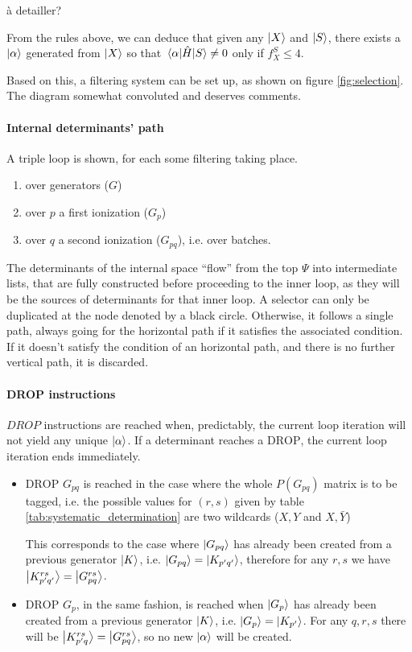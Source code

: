 \documentclass[./thesis.tex]{subfiles}
\begin{document}
\alert{à detailler?}

From the rules above, we can deduce that given any $\ket X$ and $\ket S$, there exists a ${\ket{\alpha}}$ generated from $\ket X$ so that $\mel{\alpha}{\hat{H}}{S} \neq 0$ only if $f_X^S \leq 4$.

Based on this, a filtering system can be set up, as shown on figure \ref{fig:selection}. The diagram somewhat convoluted and deserves comments.

\paragraph{Internal determinants' path}
 
A triple loop is shown, for each some filtering taking place.

\begin{enumerate}
\item
over generators ($G$)
\item
over $p$ a first ionization ($G_p$)
\item
over $q$ a second ionization ($G_{pq}$), i.e. over batches.
\end{enumerate}

The determinants of the internal space ``flow'' from the top $\Psi$ into intermediate lists, that are fully constructed before proceeding to the inner loop, as they will be the sources of determinants for that inner loop.
A selector can only be duplicated at the node denoted by a black circle. Otherwise, it follows a single path, always going for the horizontal path if it satisfies the associated condition.
If it doesn't satisfy the condition of an horizontal path, and there is no further vertical path, it is discarded.

\paragraph{DROP instructions}
$DROP$ instructions are reached when, predictably, the current loop iteration will not yield any unique ${\ket{\alpha}}$. If a determinant reaches a $\text{DROP}$, the current loop iteration ends immediately.

\begin{itemize}
\item
$\text{DROP } G_{pq}$ is reached in the case where the whole $P(G_{pq})$ matrix is to be tagged, i.e. the possible values for $(r,s)$ given by table \ref{tab:systematic_determination} are two wildcards ($X,Y$ and $X,\bar Y$)

This corresponds to the case where $\ket {G_{pq}}$ has already been created from a previous generator $\ket K$, i.e. $\ket {G_{pq}} = \ket {K_{p'q'}}$, therefore for any $r,s$ we have $\ket {K_{p'q'}^{rs}} = \ket {G_{pq}^{rs}}$.\\
\item
$\text{DROP } G_{p}$, in the same fashion, is reached when $\ket {G_{p}}$ has already been created from a previous generator $\ket K$, i.e. $\ket {G_{p}} = \ket{K_{p'}}$. For any $q,r,s$ there will be $\ket {K_{p'q}^{rs}} = \ket {G_{pq}^{rs}}$, so no new ${\ket{\alpha}}$ will be created.
\end{itemize}
\end{document}
